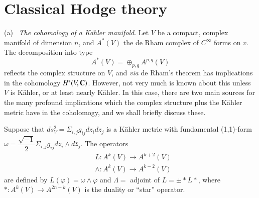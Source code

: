 \section{Classical Hodge theory}\label{art4-sec2}
(a)~ \textit{The cohomology of a K\"ahler manifold}. Let $V$ be a compact, complex manifold of dimension $n$, and $A^\ast (V)$ the de Rham complex of $C^\infty$ forms on $v$. The decomposition into type
$$
A^\ast (V) = \oplus_{p,q} A^{p,q} (V)
$$
reflects the complex structure on $V$, and \textit{via} de Rham's theorem has implications in the cohomology $H^\ast (V, \mathbf{C})$. However, not very much is known about this unless $V$ is K\"ahler, or at least nearly K\"ahler. In this case, there are two main sources for the many profound implications which the complex structure plus the K\"ahler metric have in the coholomogy, and we shall briefly discuss these.

Suppose that $ds^2_V = \Sigma_{i,j} g_{ij} dz_i dz_j$ is a K\"ahler metric with fundamental (1,1)-form $\omega = \dfrac{\sqrt{-1}}{2} \Sigma_{i,j} g_{ij} dz_i \wedge d\bar{z}_j$. The operators 
\begin{align*}
& L: A^k (V) \to A^{k+2} (V)\\ 
& \wedge : A^k (V) \to A^{k-2} (V)
\end{align*} 
are defined by $L (\varphi) = \omega \wedge \varphi$ and $\Lambda =$  adjoint of $L = \pm \ast L\ast$, where $\ast : A^k (V) \to A^{2n-k} (V)$ is the duality or ``star'' operator. 

